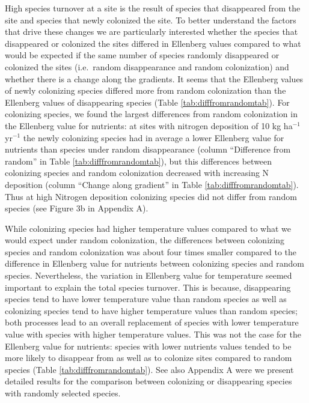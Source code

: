 \documentclass[fleqn,10pt,lineno]{wlpeerj} %
\theoremstyle{definition}
\theoremstyle{definition}
\theoremstyle{definition}
\theoremstyle{remark}
\begin{document}
High species turnover at a site is the result of species that
disappeared from the site and species that newly colonized the site. To
better understand the factors that drive these changes we are
particularly interested whether the species that disappeared or
colonized the sites differed in Ellenberg values compared to what would
be expected if the same number of species randomly disappeared or
colonized the sites (i.e.~random disappearance and random colonization)
and whether there is a change along the gradients. It seems that the
Ellenberg values of newly colonizing species differed more from random
colonization than the Ellenberg values of disappearing species (Table
\ref{tab:difffromrandomtab}). For colonizing species, we found the
largest differences from random colonization in the Ellenberg value for
nutrients: at sites with nitrogen deposition of 10 kg ha\(^{-1}\)
yr\(^{-1}\) the newly colonizing species had in average a lower
Ellenberg value for nutrients than species under random disappearance
(column ``Difference from random'' in Table
\ref{tab:difffromrandomtab}), but this differences between colonizing
species and random colonization decreased with increasing N deposition
(column ``Change along gradient'' in Table \ref{tab:difffromrandomtab}).
Thus at high Nitrogen deposition colonizing species did not differ from
random species (see Figure 3b in Appendix A).

While colonizing species had higher temperature values compared to what
we would expect under random colonization, the differences between
colonizing species and random colonization was about four times smaller
compared to the difference in Ellenberg value for nutrients between
colonizing species and random species. Nevertheless, the variation in
Ellenberg value for temperature seemed important to explain the total
species turnover. This is because, disappearing species tend to have
lower temperature value than random species as well as colonizing
species tend to have higher temperature values than random species; both
processes lead to an overall replacement of species with lower
temperature value with species with higher temperature values. This was
not the case for the Ellenberg value for nutrients: species with lower
nutrients values tended to be more likely to disappear from as well as
to colonize sites compared to random species (Table
\ref{tab:difffromrandomtab}). See also Appendix A were we present
detailed results for the comparison between colonizing or disappearing
species with randomly selected species.
\end{document}
